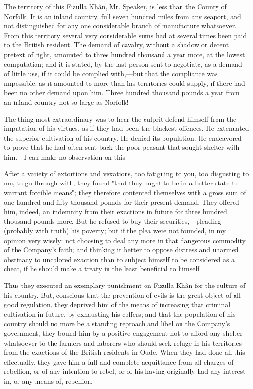 The territory of this Fizulla Khân, Mr. Speaker, is less than the County of Norfolk. It is an inland country, full seven hundred miles from any seaport, and not distinguished for any one considerable branch of manufacture whatsoever. From this territory several very considerable sums had at several times been paid to the British resident. The demand of cavalry, without a shadow or decent pretext of right, amounted to three hundred thousand a year more, at the lowest computation; and it is stated, by the last person sent to negotiate, as a demand of little use, if it could be complied with,—but that the compliance was impossible, as it amounted to more than his territories could supply, if there had been no other demand upon him. Three hundred thousand pounds a year from an inland country not so large as Norfolk!

The thing most extraordinary was to hear the culprit defend himself from the imputation of his virtues, as if they had been the blackest offences. He extenuated the superior cultivation of his country. He denied its population. He endeavored to prove that he had often sent back the poor peasant that sought shelter with him.—I can make no observation on this.

After a variety of extortions and vexations, too fatiguing to you, too disgusting to me, to go through with, they found "that they ought to be in a better state to warrant forcible means"; they therefore contented themselves with a gross sum of one hundred and fifty thousand pounds for their present demand. They offered him, indeed, an indemnity from their exactions in future for three hundred thousand pounds more. But he refused to buy their securities,—pleading (probably with truth) his poverty; but if the plea were not founded, in my opinion very wisely: not choosing to deal any more in that dangerous commodity of the Company's faith; and thinking it better to oppose distress and unarmed obstinacy to uncolored exaction than to subject himself to be considered as a cheat, if he should make a treaty in the least beneficial to himself.

Thus they executed an exemplary punishment on Fizulla Khân for the culture of his country. But, conscious that the prevention of evils is the great object of all good regulation, they deprived him of the means of increasing that criminal cultivation in future, by exhausting his coffers; and that the population of his country should no more be a standing reproach and libel on the Company's government, they bound him by a positive engagement not to afford any shelter whatsoever to the farmers and laborers who should seek refuge in his territories from the exactions of the British residents in Oude. When they had done all this effectually, they gave him a full and complete acquittance from all charges of rebellion, or of any intention to rebel, or of his having originally had any interest in, or any means of, rebellion.

